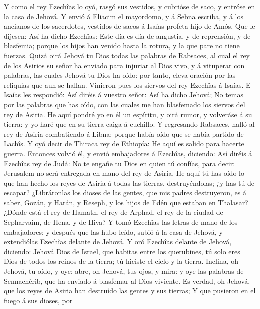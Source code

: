  Y como el rey Ezechîas lo oyó, rasgó sus vestidos, y
cubrióse de saco, y entróse en la casa de Jehová.  Y envió á
Eliacim el mayordomo, y á Sebna escriba, y á los ancianos de los
sacerdotes, vestidos de sacos á Isaías profeta hijo de Amós,
 Que le dijesen: Así ha dicho Ezechîas: Este día es día de
angustia, y de reprensión, y de blasfemia; porque los hijos han venido
hasta la rotura, y la que pare no tiene fuerzas.  Quizá oirá
Jehová tu Dios todas las palabras de Rabsaces, al cual el rey de los
Asirios su señor ha enviado para injuriar al Dios vivo, y á vituperar
con palabras, las cuales Jehová tu Dios ha oído: por tanto, eleva
oración por las reliquias que aun se hallan.  Vinieron pues
los siervos del rey Ezechîas á Isaías.  E Isaías les
respondió: Así diréis á vuestro señor: Así ha dicho Jehová; No temas por
las palabras que has oído, con las cuales me han blasfemado los siervos
del rey de Asiria.  He aquí pondré yo en él un espíritu, y
oirá rumor, y volveráse á su tierra: y yo haré que en su tierra caiga á
cuchillo.  Y regresando Rabsaces, halló al rey de Asiria
combatiendo á Libna; porque había oído que se había partido de Lachîs.
 Y oyó decir de Thiraca rey de Ethiopía: He aquí es salido
para hacerte guerra. Entonces volvió él, y envió embajadores á Ezechîas,
diciendo:  Así diréis á Ezechîas rey de Judá: No te engañe
tu Dios en quien tú confías, para decir: Jerusalem no será entregada en
mano del rey de Asiria.  He aquí tú has oído lo que han
hecho los reyes de Asiria á todas las tierras, destruyéndolas; ¿y has tú
de escapar?  ¿Libráronlas los dioses de las gentes, que mis
padres destruyeron, es á saber, Gozán, y Harán, y Reseph, y los hijos de
Edén que estaban en Thalasar?  ¿Dónde está el rey de
Hamath, el rey de Arphad, el rey de la ciudad de Sepharvaim, de Hena, y
de Hiva?  Y tomó Ezechîas las letras de mano de los
embajadores; y después que las hubo leído, subió á la casa de Jehová, y
extendiólas Ezechîas delante de Jehová.  Y oró Ezechîas
delante de Jehová, diciendo: Jehová Dios de Israel, que habitas entre
los querubines, tú solo eres Dios de todos los reinos de la tierra; tú
hiciste el cielo y la tierra.  Inclina, oh Jehová, tu oído,
y oye; abre, oh Jehová, tus ojos, y mira: y oye las palabras de
Sennachêrib, que ha enviado á blasfemar al Dios viviente. 
Es verdad, oh Jehová, que los reyes de Asiria han destruído las gentes y
sus tierras;  Y que pusieron en el fuego á sus dioses, por

